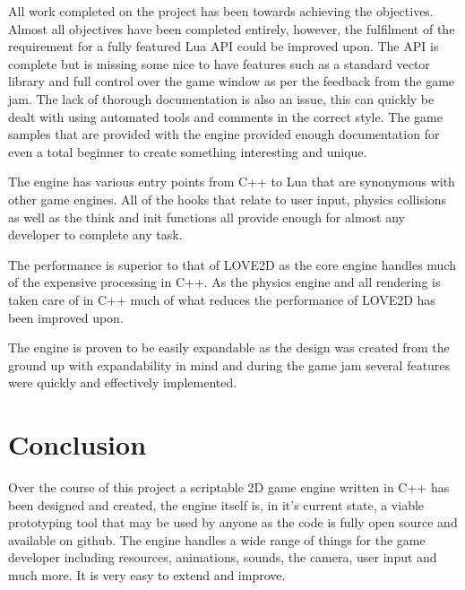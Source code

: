 \documentclass[11pt,a4paper,titlepage]{report}
\begin{document}
	
	All work completed on the project has been towards achieving the objectives. Almost all objectives have been completed entirely, however, the fulfilment of the requirement for a fully featured Lua API could be improved upon. The API is complete but is missing some nice to have features such as a standard vector library and full control over the game window as per the feedback from the game jam. The lack of thorough documentation is also an issue, this can quickly be dealt with using automated tools and comments in the correct style. The game samples that are provided with the engine provided enough documentation for even a total beginner to create something interesting and unique.

	The engine has various entry points from C++ to Lua that are synonymous with other game engines.	All of the hooks that relate to user input, physics collisions as well as the think and init functions all provide enough for almost any developer to complete any task.
	
	The performance is superior to that of LOVE2D as the core engine handles much of the expensive processing in C++. As the physics engine and all rendering is taken care of in C++ much of what reduces the performance of LOVE2D has been improved upon. 
	
	The engine is proven to be easily expandable as the design was created from the ground up with expandability in mind and during the game jam several features were quickly and effectively implemented.









\chapter{Conclusion}

	
	Over the course of this project a scriptable 2D game engine written in C++ has been designed and created, the engine itself is, in it's current state, a viable prototyping tool that may be used by anyone as the code is fully open source and available on github. The engine handles a wide range of things for the game developer including resources, animations, sounds, the camera, user input and much more. It is very easy to extend and improve.
	
\end{document}
